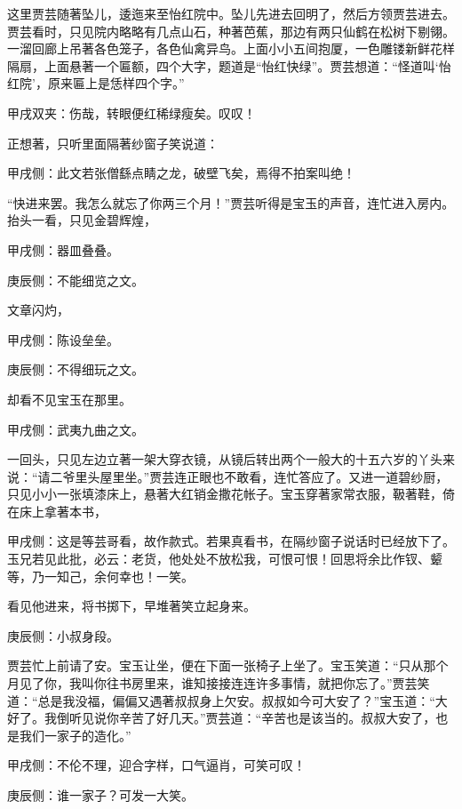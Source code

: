 \begin{parag}
    这里贾芸随著坠儿，逶迤来至怡红院中。坠儿先进去回明了，然后方领贾芸进去。贾芸看时，只见院内略略有几点山石，种著芭蕉，那边有两只仙鹤在松树下剔翎。一溜回廊上吊著各色笼子，各色仙禽异鸟。上面小小五间抱厦，一色雕镂新鲜花样隔扇，上面悬著一个匾额，四个大字，题道是“怡红快绿”。贾芸想道：“怪道叫‘怡红院’，原来匾上是恁样四个字。”\begin{note}甲戌双夹：伤哉，转眼便红稀绿瘦矣。叹叹！\end{note}正想著，只听里面隔著纱窗子笑说道：\begin{note}甲戌侧：此文若张僧繇点睛之龙，破壁飞矣，焉得不拍案叫绝！\end{note}“快进来罢。我怎么就忘了你两三个月！”贾芸听得是宝玉的声音，连忙进入房内。抬头一看，只见金碧辉煌，\begin{note}甲戌侧：器皿叠叠。\end{note}\begin{note}庚辰侧：不能细览之文。\end{note}文章闪灼，\begin{note}甲戌侧：陈设垒垒。\end{note}\begin{note}庚辰侧：不得细玩之文。\end{note}却看不见宝玉在那里。\begin{note}甲戌侧：武夷九曲之文。\end{note}一回头，只见左边立著一架大穿衣镜，从镜后转出两个一般大的十五六岁的丫头来说：“请二爷里头屋里坐。”贾芸连正眼也不敢看，连忙答应了。又进一道碧纱厨，只见小小一张填漆床上，悬著大红销金撒花帐子。宝玉穿著家常衣服，靸著鞋，倚在床上拿著本书，\begin{note}甲戌侧：这是等芸哥看，故作款式。若果真看书，在隔纱窗子说话时已经放下了。玉兄若见此批，必云：老货，他处处不放松我，可恨可恨！回思将余比作钗、颦等，乃一知己，余何幸也！一笑。\end{note}看见他进来，将书掷下，早堆著笑立起身来。\begin{note}庚辰侧：小叔身段。\end{note}贾芸忙上前请了安。宝玉让坐，便在下面一张椅子上坐了。宝玉笑道：“只从那个月见了你，我叫你往书房里来，谁知接接连连许多事情，就把你忘了。”贾芸笑道：“总是我没福，偏偏又遇著叔叔身上欠安。叔叔如今可大安了？”宝玉道：“大好了。我倒听见说你辛苦了好几天。”贾芸道：“辛苦也是该当的。叔叔大安了，也是我们一家子的造化。”\begin{note}甲戌侧：不伦不理，迎合字样，口气逼肖，可笑可叹！\end{note}\begin{note}庚辰侧：谁一家子？可发一大笑。\end{note}
\end{parag}


